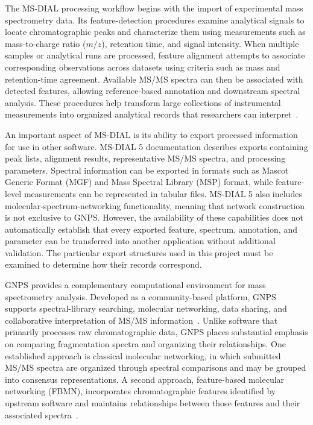         The MS-DIAL processing workflow begins with the import of experimental mass spectrometry data. Its feature-detection procedures examine analytical signals to locate chromatographic peaks and characterize them using measurements such as mass-to-charge ratio ($m/z$), retention time, and signal intensity. When multiple samples or analytical runs are processed, feature alignment attempts to associate corresponding observations across datasets using criteria such as mass and retention-time agreement. Available MS/MS spectra can then be associated with detected features, allowing reference-based annotation and downstream spectral analysis. These procedures help transform large collections of instrumental measurements into organized analytical records that researchers can interpret~\cite{Tsugawa2015,Tsugawa2018}.

        An important aspect of MS-DIAL is its ability to export processed information for use in other software. MS-DIAL 5 documentation describes exports containing peak lists, alignment results, representative MS/MS spectra, and processing parameters. Spectral information can be exported in formats such as Mascot Generic Format (MGF) and Mass Spectral Library (MSP) format, while feature-level measurements can be represented in tabular files. MS-DIAL 5 also includes molecular-spectrum-networking functionality, meaning that network construction is not exclusive to GNPS. However, the availability of these capabilities does not automatically establish that every exported feature, spectrum, annotation, and parameter can be transferred into another application without additional validation. The particular export structures used in this project must be examined to determine how their records correspond.

        GNPS provides a complementary computational environment for mass spectrometry analysis. Developed as a community-based platform, GNPS supports spectral-library searching, molecular networking, data sharing, and collaborative interpretation of MS/MS information~\cite{Wang2016}. Unlike software that primarily processes raw chromatographic data, GNPS places substantial emphasis on comparing fragmentation spectra and organizing their relationships. One established approach is classical molecular networking, in which submitted MS/MS spectra are organized through spectral comparisons and may be grouped into consensus representations. A second approach, feature-based molecular networking (FBMN), incorporates chromatographic features identified by upstream software and maintains relationships between those features and their associated spectra~\cite{Nothias2020}.

